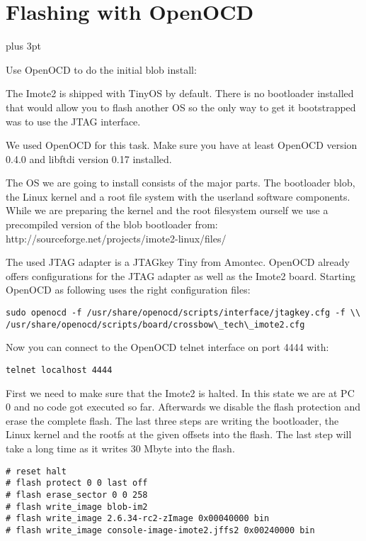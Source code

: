 \chapter{Flashing with OpenOCD}
\label{annexopenocd}
\parindent=0pt                   %
\parskip=6pt plus 3pt            %

Use OpenOCD to do the initial blob install:

The Imote2 is shipped with TinyOS by default. There is no bootloader installed
that would allow you to flash another OS so the only way to get it bootstrapped
was to use the JTAG interface.

We used OpenOCD for this task. Make sure you have at least OpenOCD version 0.4.0
and libftdi version 0.17 installed.

The OS we are going to install consists of the major parts. The bootloader blob, the
Linux kernel and a root file system with the userland software components. While
we are preparing the kernel and the root filesystem ourself we use a
precompiled version of the blob bootloader from:
http://sourceforge.net/projects/imote2-linux/files/

The used JTAG adapter is a JTAGkey Tiny from Amontec. OpenOCD already offers
configurations for the JTAG adapter as well as the Imote2 board. Starting
OpenOCD as following uses the right configuration files:

\begin{verbatim}
sudo openocd -f /usr/share/openocd/scripts/interface/jtagkey.cfg -f \\
/usr/share/openocd/scripts/board/crossbow\_tech\_imote2.cfg
\end{verbatim}

Now you can connect to the OpenOCD telnet interface on port 4444 with:

\begin{verbatim}
telnet localhost 4444
\end{verbatim}

First we need to make sure that the Imote2 is halted. In this state we are at PC
0 and no code got executed so far. Afterwards we disable the flash protection and
erase the complete flash. The last three steps are writing the bootloader, the
Linux kernel and the rootfs at the given offsets into the flash. The last step
will take a long time as it writes 30 Mbyte into the flash.

\begin{verbatim}
# reset halt
# flash protect 0 0 last off
# flash erase_sector 0 0 258
# flash write_image blob-im2
# flash write_image 2.6.34-rc2-zImage 0x00040000 bin
# flash write_image console-image-imote2.jffs2 0x00240000 bin
\end{verbatim}
